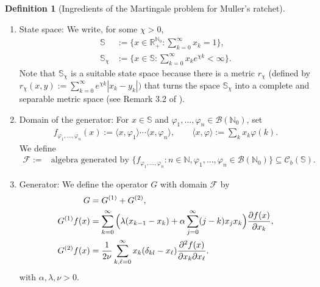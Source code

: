 \documentclass{imsart}
\theoremstyle{plain}
\theoremstyle{definition}
\newtheorem{definition}[theorem]{Definition}
\begin{document}
\begin{definition}[Ingredients of the Martingale problem for Muller's ratchet]
  \label{def:F} \mbox{}
    \begin{enumerate}
    \item State space: We write, for some $\chi > 0$,
    \begin{align*}
      \mathbb S&:= \Big\{x \in \mathbb R_+^{\mathbb N_0}: \sum_{k=0}^\infty x_k = 1\Big\}, \\
      \mathbb S_\chi &:=\Big\{x \in \mathbb S: \sum_{k=0}^\infty x_ke^{\chi k} < \infty \Big\}. 
    \end{align*}
    Note that $\mathbb S_{\chi}$ is a suitable state space because there is a metric $r_{\chi}$ (defined by  $r_{\chi}(x, y) := \sum_{k=0}^\infty e^{{\chi} k} |x_k-y_k|)$ that turns the space $\mathbb S_{\chi}$ into a complete and separable metric space (see Remark 3.2 of \cite{pfaffelhuber2012muller}). 
    \item Domain of the generator: For $x\in \mathbb S$ and $\varphi_1,...,\varphi_n \in \mathcal B(\mathbb N_0)$, set
    \begin{align}
        \label{eq:fphi}
        f_{\varphi_1,...,\varphi_n} (x) := \langle x, \varphi_1\rangle \cdots \langle x, \varphi_n\rangle, \qquad \langle x, \varphi\rangle := \sum_k x_k \varphi(k).
    \end{align}
    We define 
    \begin{align}
      \label{eq:121}
      \mathcal F := & \text{algebra generated by } \{f_{\varphi_1,...,\varphi_n}: n\in\mathbb N,
      \varphi_1,...,\varphi_n \in \mathcal B(\mathbb N_0)\} \subseteq
      \mathcal C_b(\mathbb S).
     \end{align}
     \item Generator:
      We define the operator $G$ with domain $\mathcal F$ by
      \begin{align}
        \notag 
        G & = G^{(1)} + G^{(2)},\\
        \label{eq:G1}
        G^{(1)} f(x) & = \sum_{k=0}^\infty \Big(\lambda (x_{k-1} - x_k) + \alpha  \sum_{j=0}^\infty(j-k)x_jx_k \Big)\frac{\partial f(x)}{\partial x_k}, \\
        \label{eq:G2}
        G^{(2)}f(x) & = \frac 1{2\nu} \sum_{k,\ell = 0}^\infty x_k ( \delta_{kl} - x_\ell) \frac{\partial^2 f(x)}{\partial x_k \partial x_\ell}.
      \end{align}
      with $\alpha, \lambda, \nu > 0$.
  \end{enumerate}
\end{definition}
\end{document}

